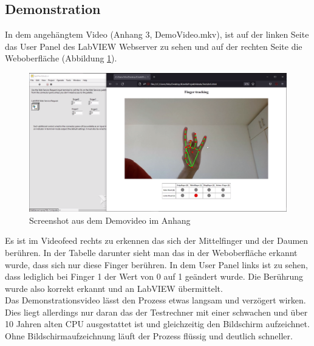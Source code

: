 \documentclass[a4paper,12pt,final]{article} %
\numberwithin{equation}{section} %
\numberwithin{figure}{section} %
\numberwithin{table}{section} %
\begin{document}
\subsection{Demonstration}
In dem angehängtem Video (Anhang 3, DemoVideo.mkv), ist auf der linken Seite das User Panel des LabVIEW Webserver zu sehen und auf der rechten Seite die Weboberfläche (Abbildung \ref{fig:ScreenshotVideo}).
\begin{figure}[H]
	\begin{center}
		\includegraphics[width=12cm]{Bilder/ScreenshotVideo.png}
		\caption{Screenshot aus dem Demovideo im Anhang}
		\label{fig:ScreenshotVideo}
	\end{center}
\end{figure}
Es ist im Videofeed rechts zu erkennen das sich der Mittelfinger und der Daumen berühren. In der Tabelle darunter sieht man das in der Weboberfläche erkannt wurde, dass sich nur diese Finger berühren.
In dem User Panel links ist zu sehen, dass lediglich bei Finger 1 der Wert von 0 auf 1 geändert wurde. Die Berührung wurde also korrekt erkannt und an LabVIEW übermittelt.\\
Das Demonstrationsvideo lässt den Prozess etwas langsam und verzögert wirken. Dies liegt allerdings nur daran das der Testrechner mit einer schwachen und über 10 Jahren alten CPU ausgestattet ist und gleichzeitig den Bildschirm aufzeichnet. 
Ohne Bild\-schirm\-auf\-zeich\-nung läuft der Prozess flüssig und deutlich schneller. 
\newpage
\end{document}
